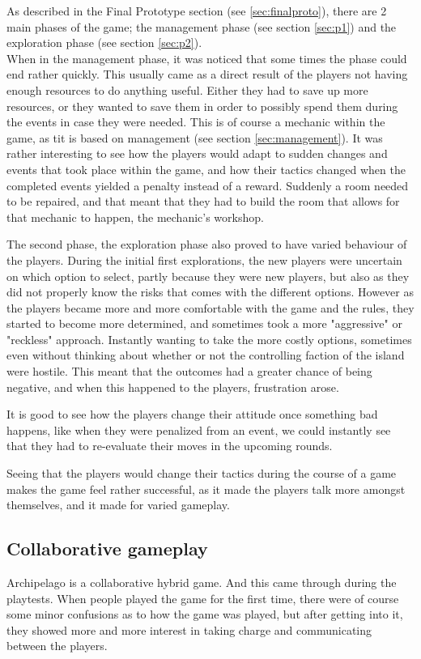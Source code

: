 As described in the Final Prototype section (see \ref{sec:finalproto}), there are 2 main phases of the game; the management phase (see section \ref{sec:p1}) and the exploration phase (see section \ref{sec:p2}).\\When in the management phase, it was noticed that some times the phase could end rather quickly. This usually came as a direct result of the players not having enough resources to do anything useful. Either they had to save up more resources, or they wanted to save them in order to possibly spend them during the events in case they were needed. This is of course a mechanic within the game, as tit is based on management (see section \ref{sec:management}). It was rather interesting to see how the players would adapt to sudden changes and events that took place within the game, and how their tactics changed when the completed events yielded a penalty instead of a reward. Suddenly a room needed to be repaired, and that meant that they had to build the room that allows for that mechanic to happen, the mechanic's workshop.

The second phase, the exploration phase also proved to have varied behaviour of the players. During the initial first explorations, the new players were uncertain on which option to select, partly because they were new players, but also as they did not properly know the risks that comes with the different options. However as the players became more and more comfortable with the game and the rules, they started to become more determined, and sometimes took a more "aggressive" or "reckless" approach. Instantly wanting to take the more costly options, sometimes even without thinking about whether or not the controlling faction of the island were hostile. This meant that the outcomes had a greater chance of being negative, and when this happened to the players, frustration arose. 

It is good to see how the players change their attitude once something bad happens, like when they were penalized from an event, we could instantly see that they had to re-evaluate their moves in the upcoming rounds. 

Seeing that the players would change their tactics during the course of a game makes the game feel rather successful, as it made the players talk more amongst themselves, and it made for varied gameplay.

\subsection{Collaborative gameplay} 
Archipelago is a collaborative hybrid game. And this came through during the playtests. When people played the game for the first time, there were of course some minor confusions as to how the game was played, but after getting into it, they showed more and more interest in taking charge and communicating between the players.

